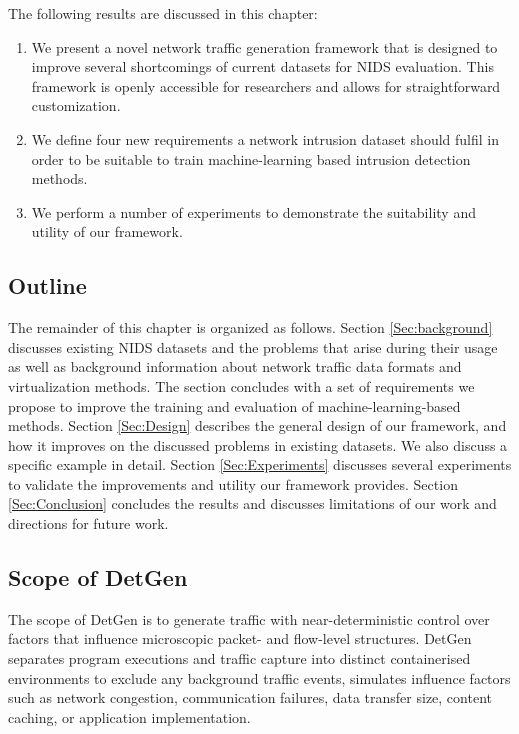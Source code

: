 The following results are discussed in this chapter:

\begin{enumerate}
 \item We present a novel network traffic generation framework that is designed to improve several shortcomings of current datasets for NIDS evaluation. This framework is openly accessible for researchers and allows for straightforward customization.
 \item We define four new requirements a network intrusion dataset should fulfil in order to be suitable to train machine-learning based intrusion detection methods. 
 \item We perform a number of experiments to demonstrate the suitability and utility of our framework. 
\end{enumerate}

\subsection{Outline}

The remainder of this chapter is organized as follows. Section \ref{Sec:background} discusses existing NIDS datasets and the problems that arise during their usage as well as background information about network traffic data formats and virtualization methods. The section concludes with a set of requirements we propose to improve the training and evaluation of machine-learning-based methods. Section \ref{Sec:Design} describes the general design of our framework, and how it improves on the discussed problems in existing datasets. We also discuss a specific example in detail. Section \ref{Sec:Experiments} discusses several experiments to validate the improvements and utility our framework provides. 
Section \ref{Sec:Conclusion} concludes the results and discusses limitations of our work and directions for future work.

\subsection{Scope of DetGen}

The scope of DetGen is to generate traffic with near-deterministic control over factors that influence microscopic packet- and flow-level structures. DetGen separates program executions and traffic capture into distinct containerised environments to exclude any background traffic events, simulates influence factors such as network congestion, communication failures, data transfer size, content caching, or application implementation. %


